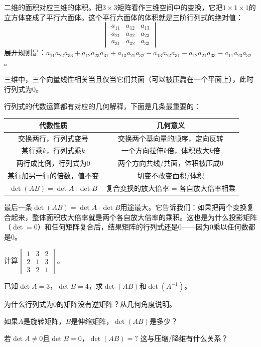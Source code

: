 \documentclass[a4paper,12pt]{ctexart}
\begin{document}

二维的面积对应三维的体积。把$3\times3$矩阵看作三维空间中的变换，它把$1\times1\times1$的立方体变成了平行六面体。这个平行六面体的体积就是三阶行列式的绝对值：
\[
\begin{vmatrix}
a_{11}&a_{12}&a_{13}\\
a_{21}&a_{22}&a_{23}\\
a_{31}&a_{32}&a_{33}
\end{vmatrix}
\]
展开规则是：$a_{11}a_{22}a_{33}+a_{12}a_{23}a_{31}+a_{13}a_{21}a_{32}-a_{13}a_{22}a_{31}-a_{12}a_{21}a_{33}-a_{11}a_{23}a_{32}$。

三维中，三个向量线性相关当且仅当它们共面（可以被压扁在一个平面上），此时行列式为$0$。


行列式的代数运算都有对应的几何解释，下面是几条最重要的：

\begin{center}
\begin{tabular}{c|c}
\textbf{代数性质} & \textbf{几何意义}\\\hline
交换两行，行列式变号 & 交换两个基向量的顺序，定向反转\\
某行乘$k$，行列式乘$k$ & 一个方向拉伸$k$倍，体积放大$k$倍\\
两行成比例，行列式为$0$ & 两个方向共线/共面，体积被压成$0$\\
某行加另一行的倍数，值不变 & 切变不改变面积/体积\\
$\det(AB)=\det A\cdot\det B$ & 复合变换的放大倍率 = 各自放大倍率相乘
\end{tabular}
\end{center}

最后一条$\det(AB)=\det A\cdot\det B$用途最大。它告诉我们：如果把两个变换复合起来，整体面积放大倍率就是两个各自放大倍率的乘积。这也是为什么投影矩阵（$\det=0$）和任何矩阵复合后，结果矩阵的行列式还是$0$——因为$0$乘以任何数都是$0$。

\begin{exercise}[行列式综合练习]
\item 计算$\begin{vmatrix}1&3&2\\2&1&3\\3&2&1\end{vmatrix}$。
\item 已知$\det A=3$，$\det B=4$，求$\det(AB)$和$\det(A^{-1})$。
\item 为什么行列式为$0$的矩阵没有逆矩阵？从几何角度说明。
\item 如果$A$是旋转矩阵，$B$是伸缩矩阵，$\det(AB)$是多少？
\item 若$\det A\neq0$且$\det B=0$，$\det(AB)=?$ 这与压缩/降维有什么关系？
\end{exercise}
\end{document}

